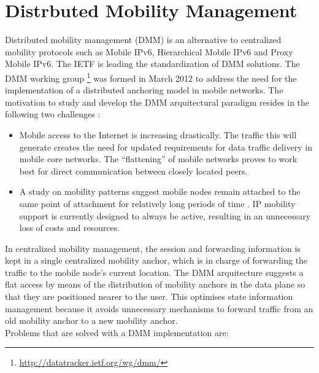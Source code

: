 \section{Distrbuted Mobility Management}\label{sec:chap2_dmm}

Distributed mobility management (DMM) is an alternative to centralized mobility protocols such as Mobile IPv6, Hierarchical Mobile IPv6 and Proxy Mobile IPv6. The IETF is leading the standardization of DMM solutions. The DMM working group 
\footnote{\url{http://datatracker.ietf.org/wg/dmm/}} was formed in March 2012 to address the need for the implementation of a distributed anchoring model in mobile networks. The motivation to study and develop the DMM arquitectural paradigm resides in the following two challenges \cite{rfc_7333}: 

\begin{itemize}
\item{Mobile access to the Internet is increasing drastically. The traffic this will generate creates the need for updated requirements for data traffic delivery in mobile core networks. The ``flattening'' of mobile networks proves to work best for direct communication between closely located peers.}
\item{A study on mobility patterns suggest mobile nodes remain attached to the same point of attachment for relatively long periods of time \cite{locating_user}. IP mobility support is currently designed to always be active, resulting in an unnecessary loss of costs and resources.}
\end{itemize}

In centralized mobility management, the session and forwarding information is kept in a single centralized mobility anchor, which is in charge of forwarding the traffic to the mobile node's current location. The DMM arquitecture suggests a flat access by means of the distribution of mobility anchors in the data plane so that they are positioned nearer to the user. This optimises state information management because it avoids unnecessary mechanisms to forward traffic from an old mobility anchor to a new mobility anchor.\\

Problems that are solved with a DMM implementation are:

